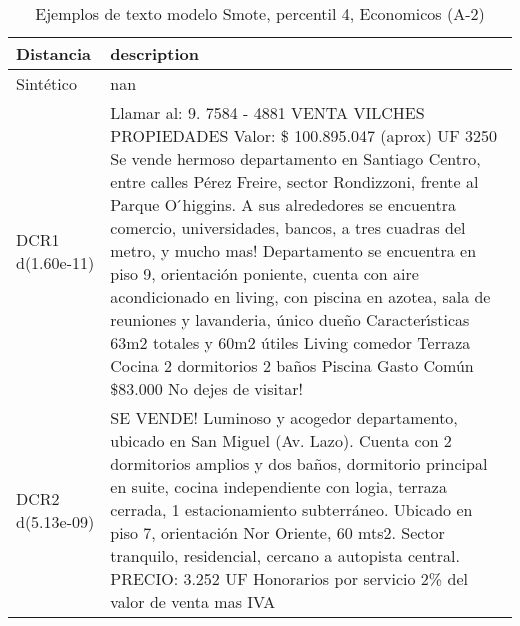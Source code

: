 \begin{table}[H]
\centering
\fontsize{10}{14}\selectfont
\caption{Ejemplos de texto modelo Smote, percentil 4, Economicos (A-2)}
\label{table-example-economicos-a-2-smote-enc-4p-text}
\begin{tabular}{|l|m{35em}|}
\hline
\rowcolor[gray]{0.8}
Distancia & description \\
\hline Sintético & nan \\
\hline DCR1 d(1.60e-11) & Llamar al: 9. 7584 - 4881 VENTA VILCHES PROPIEDADES Valor: \$ 100.895.047 (aprox) UF 3250 Se vende hermoso departamento en Santiago Centro, entre calles P\'erez Freire, sector Rondizzoni, frente al Parque O ́higgins. A sus alrededores se encuentra comercio, universidades, bancos, a tres cuadras del metro, y mucho mas! Departamento se encuentra en piso 9, orientaci\'on poniente, cuenta con aire acondicionado en living, con piscina en azotea, sala de reuniones y lavanderia, \'unico due\~no Caracter{\'\i}sticas 63m2 totales y 60m2 \'utiles Living comedor Terraza Cocina 2 dormitorios 2 ba\~nos Piscina Gasto Com\'un \$83.000 No dejes de visitar! \\
\hline DCR2 d(5.13e-09) & SE VENDE! Luminoso y acogedor departamento, ubicado en San Miguel (Av. Lazo). Cuenta con 2 dormitorios amplios y dos ba\~nos, dormitorio principal en suite, cocina independiente con logia, terraza cerrada, 1 estacionamiento subterr\'aneo. Ubicado en piso 7, orientaci\'on Nor Oriente, 60 mts2. Sector tranquilo, residencial, cercano a autopista central. PRECIO: 3.252 UF Honorarios por servicio 2\% del valor de venta mas IVA \\
\hline
\end{tabular}
\end{table}
